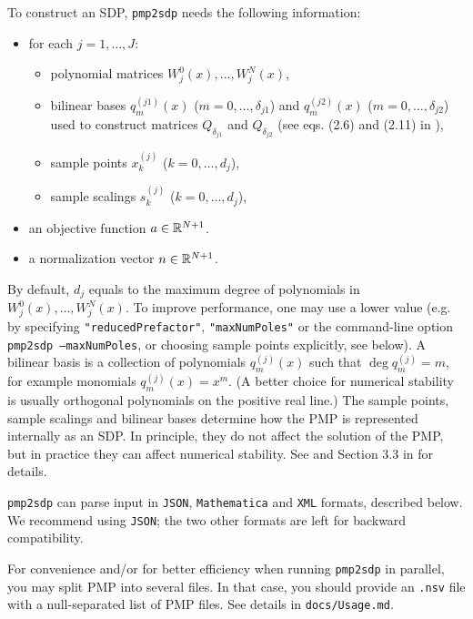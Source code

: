 \documentclass[12pt]{article}
\numberwithin{equation}{section}
\begin{document}
To construct an SDP, \texttt{pmp2sdp} needs the following information:
\begin{itemize}
	\item for each $j=1,\dots,J$:
	\begin{itemize}
		\item polynomial matrices $W^0_j(x),\dots,W^N_j(x)$,
		\item bilinear bases $q_m^{(j1)}(x)$ ($m=0,\dots,\delta_{j1}$) 
			and $q_m^{(j2)}(x)$ ($m=0,\dots,\delta_{j2}$)
			used to construct matrices $Q_{\delta_{j1}}$ and $Q_{\delta_{j2}}$
			(see eqs. (2.6) and (2.11) in \cite{DSD}),
		\item sample points $x_k^{(j)}$ ($k=0,\dots,d_j$),
		\item sample scalings $s_k^{(j)}$ ($k=0,\dots,d_j$),
	\end{itemize}
	\item an objective function $a\in \mathbb{R}^{N+1}$.
	\item a normalization vector $n\in \mathbb{R}^{N+1}$.
\end{itemize}
By default, $d_j$ equals to the maximum degree of polynomials in $W^0_j(x),\dots,W^N_j(x)$.
To improve performance, one may use a lower value (e.g. by specifying \texttt{"reducedPrefactor"}, \texttt{"maxNumPoles"} or the command-line option \texttt{pmp2sdp --maxNumPoles}, or choosing sample points explicitly, see below).
A bilinear basis is a collection of polynomials $q_m^{(j)}(x)$ such that $\deg q_m^{(j)} = m$, for example monomials $q_m^{(j)}(x)=x^m$.  (A better choice for numerical stability is usually orthogonal polynomials on the positive real line.)  The sample points, sample scalings and bilinear bases determine how the PMP is represented internally as an SDP.  In principle, they do not affect the solution of the PMP, but in practice they can affect numerical stability.
See \cite{Chang:2025mwt} and Section 3.3 in \cite{DSD} for details.


\texttt{pmp2sdp} can parse input in \texttt{JSON}, \texttt{Mathematica} and \texttt{XML} formats, described below.
We recommend using \texttt{JSON}; the two other formats are left for backward compatibility.

For convenience and/or for better efficiency when running \texttt{pmp2sdp} in parallel,
you may split PMP into several files.
In that case, you should provide an \texttt{.nsv} file with a null-separated list of PMP files.
See details in \texttt{docs/Usage.md}.
\end{document}
